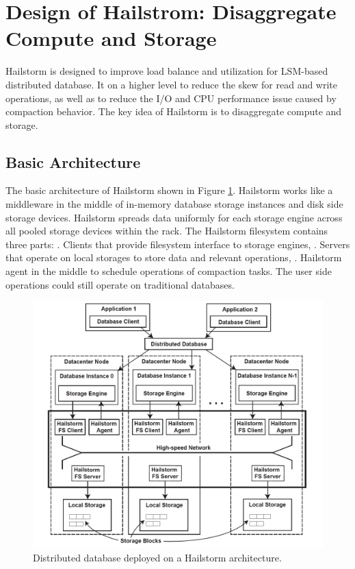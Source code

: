 \documentclass[a4paper,10pt,twoside]{article}
\begin{document}
\section{Design of Hailstrom: Disaggregate Compute and Storage}
\label{Design}

Hailstorm is designed to improve load balance and utilization for LSM-based distributed database.
It on a higher level to reduce the skew for read and write operations, as well as to reduce the I/O and CPU performance issue caused by compaction behavior.
The key idea of Hailstorm is to disaggregate compute and storage.

\subsection{Basic Architecture}
\par
The basic architecture of Hailstorm shown in Figure \ref{fig:mesh5}. 
Hailstorm works like a middleware in the middle of in-memory database storage instances and disk side storage devices.
Hailstorm spreads data uniformly for each storage engine across all pooled storage devices within the rack.
The Hailstorm filesystem contains three parts:
. Clients that provide filesystem interface to storage engines,
. Servers that operate on local storages to store data and relevant operations,
. Hailstorm agent in the middle to schedule operations of compaction tasks.
\newline
The user side operations could still operate on traditional databases. 

\begin{figure}[h]
    \centering
	\includegraphics[scale=0.3]{Hailstorm2.png}
    \caption{ Distributed database deployed on a Hailstorm architecture.}
    \label{fig:mesh5}
\end{figure}
\end{document}
